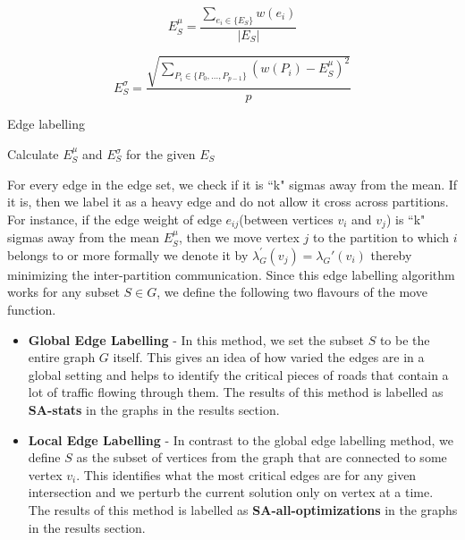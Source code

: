 \begin{equation}
\label{eq:comm1-mean}
E_S^\mu = \frac{\sum\limits_{e_i \in \{E_S\}} w(e_i)}{|E_S|}
\end{equation}

\begin{equation}
\label{eq:comm1}
E_S^\sigma = \frac{\sqrt{\sum\limits_{P_i \in \{P_0,\dots,P_{p-1}\}} (w(P_i) - E_S^\mu)^2}}{p}
\end{equation}

\begin{algorithm}[ht!]
    \caption{Edge labelling}
    \label{algo:ga}
    Calculate $E_S^\mu$ and $E_S^\sigma$ for the given $E_S$\\
\end{algorithm}

For every edge in the edge set, we check if it is ``k" sigmas away from the mean. If it is, then we label it as a heavy edge and do not allow it cross across partitions. For instance, if the edge weight of edge $e_{ij}$(between vertices $v_i$ and $v_j$) is ``k" sigmas away from the mean $E_S^\mu$, then we move vertex $j$ to the partition to which $i$ belongs to or more formally we denote it by $\lambda_G^{'}(v_j) = \lambda_G{'}(v_i)$ thereby minimizing the inter-partition communication. Since this edge labelling algorithm works for any subset $S \in G$, we define the following two flavours of the move function.

\begin{itemize}
\item \textbf{Global Edge Labelling} - In this method, we set the subset $S$ to be the entire graph $G$ itself. This gives an idea of how varied the edges are in a global setting and helps to identify the critical pieces of roads that contain a lot of traffic flowing through them. The results of this method is labelled as \textbf{SA-stats} in the graphs in the results section.
\item \textbf{Local Edge Labelling} - In contrast to the global edge labelling method, we define $S$ as the subset of vertices from the graph that are connected to some vertex $v_i$. This identifies what the most critical edges are for any given intersection and we perturb the current solution only on vertex at a time. The results of this method is labelled as \textbf{SA-all-optimizations} in the graphs in the results section.
\end{itemize}

